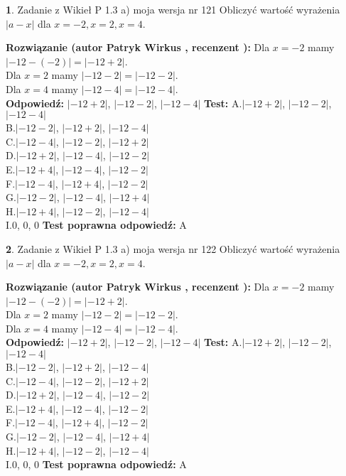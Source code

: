 \documentclass[12pt, a4paper]{article}
\theoremstyle{definition} %
\newtheorem{zad}{}
\newcommand{\zadStart}[1]{\begin{zad}#1\newline}
\newcommand{\zadStop}{\end{zad}}
\newcommand{\rozwStart}[2]{\noindent \textbf{Rozwiązanie (autor #1 , recenzent #2): }\newline}
\newcommand{\rozwStop}{\newline}
\newcommand{\odpStart}{\noindent \textbf{Odpowiedź:}\newline}
\newcommand{\odpStop}{\newline}
\newcommand{\testStart}{\noindent \textbf{Test:}\newline}
\newcommand{\testStop}{\newline}
\newcommand{\kluczStart}{\noindent \textbf{Test poprawna odpowiedź:}\newline}
\newcommand{\kluczStop}{\newline}
\begin{document}
\zadStart{Zadanie z Wikieł P 1.3 a) moja wersja nr 121}
Obliczyć wartość wyrażenia $|a - x|$ dla $x=-2,x=2,x=4$.
\zadStop
\rozwStart{Patryk Wirkus}{}
Dla $x = -2$ mamy $|-12 - (-2)| = |-12 + 2|$.\\
Dla $x = 2$ mamy $|-12 - 2| = |-12 - 2|$.\\
Dla $x = 4$ mamy $|-12 - 4| = |-12 - 4|$.\\
\rozwStop
\odpStart
$|-12 + 2|$, $|-12 - 2|$, $|-12 - 4|$
\odpStop
\testStart
A.$|-12 + 2|$, $|-12 - 2|$, $|-12 - 4|$\\
B.$|-12 - 2|$, $|-12 + 2|$, $|-12 - 4|$\\
C.$|-12 - 4|$, $|-12 - 2|$, $|-12 + 2|$\\
D.$|-12 + 2|$, $|-12 - 4|$, $|-12 - 2|$\\
E.$|-12 + 4|$, $|-12 - 4|$, $|-12 - 2|$\\
F.$|-12 - 4|$, $|-12 + 4|$, $|-12 - 2|$\\
G.$|-12 - 2|$, $|-12 - 4|$, $|-12 + 4|$\\
H.$|-12 + 4|$, $|-12 - 2|$, $|-12 - 4|$\\
I.$0$, $0$, $0$
\testStop
\kluczStart
A
\kluczStop



\zadStart{Zadanie z Wikieł P 1.3 a) moja wersja nr 122}
Obliczyć wartość wyrażenia $|a - x|$ dla $x=-2,x=2,x=4$.
\zadStop
\rozwStart{Patryk Wirkus}{}
Dla $x = -2$ mamy $|-12 - (-2)| = |-12 + 2|$.\\
Dla $x = 2$ mamy $|-12 - 2| = |-12 - 2|$.\\
Dla $x = 4$ mamy $|-12 - 4| = |-12 - 4|$.\\
\rozwStop
\odpStart
$|-12 + 2|$, $|-12 - 2|$, $|-12 - 4|$
\odpStop
\testStart
A.$|-12 + 2|$, $|-12 - 2|$, $|-12 - 4|$\\
B.$|-12 - 2|$, $|-12 + 2|$, $|-12 - 4|$\\
C.$|-12 - 4|$, $|-12 - 2|$, $|-12 + 2|$\\
D.$|-12 + 2|$, $|-12 - 4|$, $|-12 - 2|$\\
E.$|-12 + 4|$, $|-12 - 4|$, $|-12 - 2|$\\
F.$|-12 - 4|$, $|-12 + 4|$, $|-12 - 2|$\\
G.$|-12 - 2|$, $|-12 - 4|$, $|-12 + 4|$\\
H.$|-12 + 4|$, $|-12 - 2|$, $|-12 - 4|$\\
I.$0$, $0$, $0$
\testStop
\kluczStart
A
\kluczStop
\end{document}
